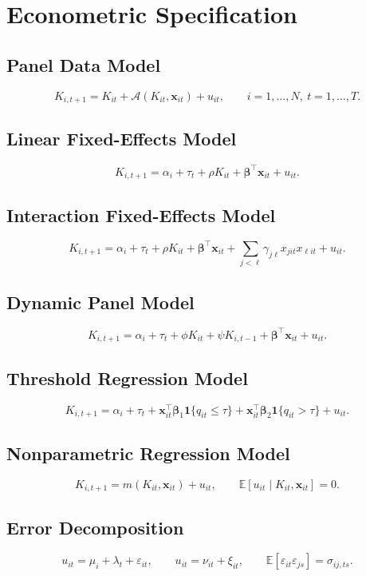 \documentclass[11pt]{article}
\begin{document}
\section{Econometric Specification}

\subsection{Panel Data Model}
\[
K_{i,t+1}=K_{it}+\mathcal{A}(K_{it},\bm{x}_{it})+u_{it},
\qquad i=1,\dots,N,\ t=1,\dots,T.
\]

\subsection{Linear Fixed-Effects Model}
\[
K_{i,t+1}=\alpha_i+\tau_t+\rho K_{it}+\bm{\beta}^\top\bm{x}_{it}+u_{it}.
\]

\subsection{Interaction Fixed-Effects Model}
\[
K_{i,t+1}=\alpha_i+\tau_t+\rho K_{it}+\bm{\beta}^\top\bm{x}_{it}+\sum_{j<\ell}\gamma_{j\ell}x_{jit}x_{\ell it}+u_{it}.
\]

\subsection{Dynamic Panel Model}
\[
K_{i,t+1}=\alpha_i+\tau_t+\phi K_{it}+\psi K_{i,t-1}+\bm{\beta}^\top\bm{x}_{it}+u_{it}.
\]

\subsection{Threshold Regression Model}
\[
K_{i,t+1}=\alpha_i+\tau_t+\bm{x}_{it}^\top\bm{\beta}_1\mathbf{1}\{q_{it}\le\tau\}+\bm{x}_{it}^\top\bm{\beta}_2\mathbf{1}\{q_{it}>\tau\}+u_{it}.
\]

\subsection{Nonparametric Regression Model}
\[
K_{i,t+1}=m(K_{it},\bm{x}_{it})+u_{it},
\qquad \mathbb{E}[u_{it}\mid K_{it},\bm{x}_{it}]=0.
\]

\subsection{Error Decomposition}
\[
u_{it}=\mu_i+\lambda_t+\varepsilon_{it},
\qquad u_{it}=\nu_{it}+\xi_{it},
\qquad \mathbb{E}[\varepsilon_{it}\varepsilon_{js}]=\sigma_{ij,ts}.
\]
\end{document}
